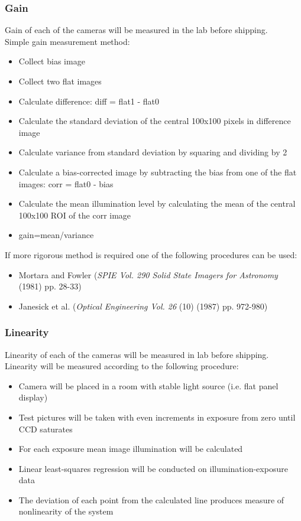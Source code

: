 \subsubsection{Gain}
Gain of each of the cameras will be measured in the lab before shipping. \\
Simple gain measurement method:
\begin{itemize}
\item Collect bias image
\item Collect two flat images
\item Calculate difference: diff = flat1 - flat0
\item Calculate the standard deviation of the central 100x100 pixels in difference image
\item Calculate variance from standard deviation by squaring and dividing by 2
\item Calculate a bias-corrected image by subtracting the bias from one of the flat images: corr = flat0 - bias
\item Calculate the mean illumination level by calculating the mean of the central 100x100 ROI of the corr image
\item gain=mean/variance
\end{itemize}

If more rigorous method is required one of the following procedures can be used:
\begin{itemize}
\item Mortara and Fowler (\emph{SPIE Vol. 290 Solid State Imagers for Astronomy} (1981) pp. 28-33)
\item Janesick et al. (\emph{Optical Engineering Vol. 26} (10) (1987) pp. 972-980)
\end{itemize}

\subsubsection{Linearity}
Linearity of each of the cameras will be measured in lab before shipping. 
Linearity will be measured according to the following procedure:
\begin{itemize}
\item Camera will be placed in a room with stable light source (i.e. flat panel display)
\item Test pictures will be taken with even increments in exposure from zero until CCD saturates
\item For each exposure mean image illumination will be calculated
\item Linear least-squares regression will be conducted on illumination-exposure data
\item The deviation of each point from the calculated line produces measure of nonlinearity of the system
\end{itemize}

